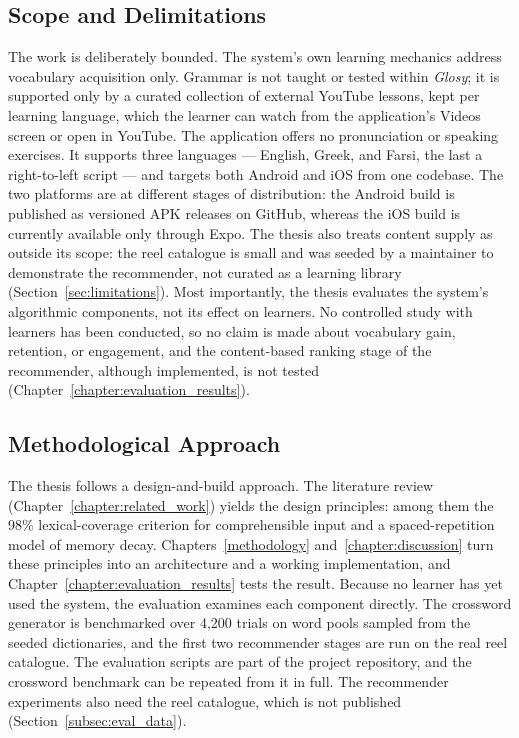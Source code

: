     \subsection{Scope and Delimitations}
    The work is deliberately bounded. The system's own learning mechanics address vocabulary acquisition only. Grammar is not taught or tested within \textit{Glosy}; it is supported only by a curated collection of external YouTube lessons, kept per learning language, which the learner can watch from the application's Videos screen or open in YouTube. The application offers no pronunciation or speaking exercises. It supports three languages --- English, Greek, and Farsi, the last a right-to-left script --- and targets both Android and iOS from one codebase. The two platforms are at different stages of distribution: the Android build is published as versioned APK releases on GitHub, whereas the iOS build is currently available only through Expo. The thesis also treats content supply as outside its scope: the reel catalogue is small and was seeded by a maintainer to demonstrate the recommender, not curated as a learning library (Section~\ref{sec:limitations}). Most importantly, the thesis evaluates the system's algorithmic components, not its effect on learners. No controlled study with learners has been conducted, so no claim is made about vocabulary gain, retention, or engagement, and the content-based ranking stage of the recommender, although implemented, is not tested (Chapter~\ref{chapter:evaluation_results}).

    \subsection{Methodological Approach}
    The thesis follows a design-and-build approach. The literature review (Chapter~\ref{chapter:related_work}) yields the design principles: among them the 98\% lexical-coverage criterion for comprehensible input and a spaced-repetition model of memory decay. Chapters~\ref{methodology} and~\ref{chapter:discussion} turn these principles into an architecture and a working implementation, and Chapter~\ref{chapter:evaluation_results} tests the result. Because no learner has yet used the system, the evaluation examines each component directly. The crossword generator is benchmarked over 4{,}200 trials on word pools sampled from the seeded dictionaries, and the first two recommender stages are run on the real reel catalogue. The evaluation scripts are part of the project repository, and the crossword benchmark can be repeated from it in full. The recommender experiments also need the reel catalogue, which is not published (Section~\ref{subsec:eval_data}).

